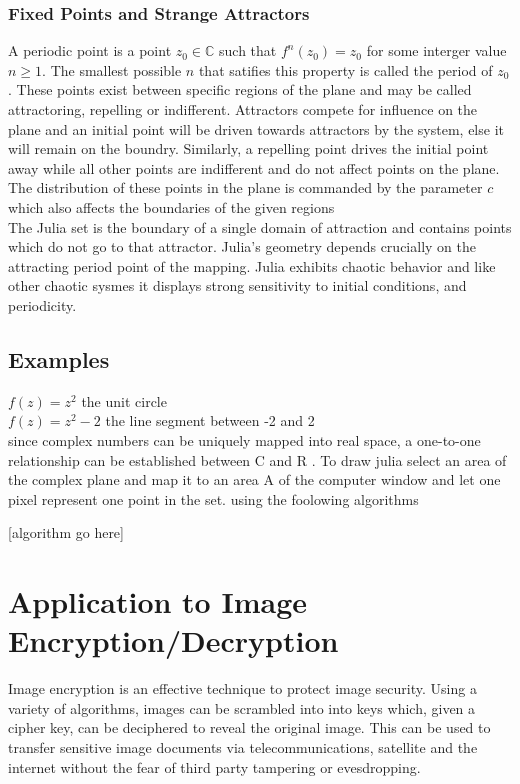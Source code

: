 \documentclass[12pt]{article}
\begin{document}
{\subsubsection{Fixed Points and Strange Attractors}
A periodic point is a point $z_0 \in \mathbb{C}$ such that $f^{n}(z_0) = z_0$ for some interger value $n \ge 1$. \cite{tokyo} The smallest possible $n$ that satifies this property is called the period of $z_0$.  These points exist between specific regions of the plane and may be called attractoring, repelling or indifferent. \cite{beauty} \cite{tokyo} Attractors compete for influence on the plane and an initial point will be driven towards attractors by the system, else it will remain on the boundry. Similarly, a repelling point drives the initial point away while all other points are indifferent and do not affect points on the plane. The distribution of these points in the plane is commanded by the parameter $c$ which also affects the boundaries of the given regions \cite{beauty}\\

The Julia set is the boundary of a single domain of attraction and contains points which do not go to that attractor. \cite{beauty} Julia's geometry depends crucially on the attracting period point of the mapping. \cite{yang} Julia exhibits chaotic behavior \cite{hypertext} and like other chaotic sysmes \cite{goodwin} it displays strong sensitivity to initial conditions, and periodicity.

\subsection{Examples}
$f(z) = z^{2}$ \: \: \: \: \: the unit circle \cite{Fassett} \\
$f(z) = z^{2}-2$ \: \: the line segment between -2 and 2 \\

since complex numbers can be uniquely mapped into real space,  a one-to-one relationship can be established between C and R \cite{china}. To draw julia select an area of the complex plane and map it to an area A of the computer window and let one pixel represent one point in the set. \cite{china} using the foolowing algorithms

[algorithm go here]


}


\section{Application to Image Encryption/Decryption}
Image encryption is an effective technique to protect image security. Using a variety of algorithms, images can be scrambled into into keys which, given a cipher key, can be deciphered to reveal the original image. This can be used to transfer sensitive image documents via telecommunications, satellite and the internet without the fear of third party tampering or evesdropping. \\
\end{document}
